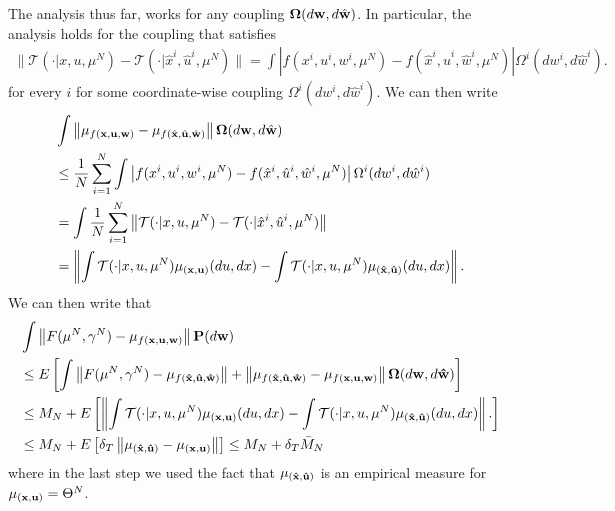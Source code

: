 \documentclass[twoside,11pt]{article}
\begin{document}
The analysis thus far, works for any coupling  ${\bf \Omega}(d{\bf w}, d\hat{\bf w})$. In particular, the analysis holds for the coupling that satisfies
\begin{align*}
\| \mathcal{T}(\cdot|x,u,\mu^N) - {\mathcal{T}}(\cdot|\hat{x}^i,\hat{u}^i,{\mu}^N)\| =  \int  \left| f(x^i,u^i,w^i, \mu^N) - {f}(\hat{x}^i,\hat{u}^i,\hat{w}^i,{\mu}^N) \right|  { \Omega^i}(dw^i, d\hat{w}^i).
\end{align*}
for every $i$ for some coordinate-wise coupling $\Omega^i(dw^i,d\hat{w}^i)$. We can then write 
\begin{align*}
 & \int  \left\|\mu_{ f({\bf x},{\bf u},{\bf w})} - {\mu}_{{f}(\hat{\bf x}, \hat{\bf u} , \hat{\bf w}) }\right\| {\bf \Omega}(d{\bf w}, d\hat{\bf w}) \nonumber\\
&\leq \frac{1}{N}\sum_{i=1}^N \int  \left| f(x^i,u^i,w^i, \mu^N) - {f}(\hat{x}^i,\hat{u}^i,\hat{w}^i,{\mu^N}) \right|  { \Omega^i}(dw^i, d\hat{w}^i)\\
& = \int \frac{1}{N}\sum_{i=1}^N \left\|  \mathcal{T}(\cdot|x,u,\mu^N) - {\mathcal{T}}(\cdot|\hat{x}^i,\hat{u}^i,{\mu^N})\right\|\\
&=\left\| \int  \mathcal{T}(\cdot|x,u,\mu^N) \mu_{\bf (x,u)}(du,dx) - \int{\mathcal{T}}(\cdot|x,u,{\mu^N}) \mu_{(\bf \hat{x} , \hat{u})}(du,dx)\right\|.
\end{align*}
We can then write that
\begin{align*}
& \int \left\|  F(\mu^N,\gamma^N) -\mu_{f(\bf x,u,w)}\right\| {\bf P}(d{\bf w}) \\
&\leq  E\left[  \int \left\|  F(\mu^N,\gamma^N) - \mu_{f ({\bf \hat{x},\hat{u},\hat{w}})}\right\|   +   \left\|   \mu_{f ({\bf \hat{x},\hat{u},\hat{w}})} -   \mu_{f(\bf x,u,w)}\right\| {\bf \Omega}(d{\bf w}, d{\bf \hat{w}})  \right]\\
&\leq M_N + E\left[\left\| \int  \mathcal{T}(\cdot|x,u,\mu^N) \mu_{\bf (x,u)}(du,dx) - \int{\mathcal{T}}(\cdot|x,u,{\mu^N}) \mu_{(\bf \hat{x} , \hat{u})}(du,dx)\right\|.\right]\\
& \leq M_N + E\left[\delta_T\left\|\mu_{\bf (\hat{x},\hat{u})} - \mu_{(\bf x,u)}\right\| \right] \leq M_N + \delta_T \bar{M}_N
\end{align*}
where in the last step we used the fact that $\mu_{\bf (\hat{x},\hat{u})}$ is an empirical measure for $\mu_{(\bf x,u)} = \Theta^N$.
\end{document}
